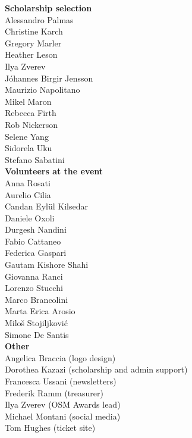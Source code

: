 \begin{multicols}{2}
\begin{small}
    \vspace{\volunteerSpace}
    \textbf{Scholarship selection}\\
    Alessandro Palmas\\
    Christine Karch\\
    Gregory Marler\\
    Heather Leson\\
    Ilya Zverev\\
    Jóhannes Birgir Jensson\\
    Maurizio Napolitano\\
    Mikel Maron\\
    Rebecca Firth\\
    Rob Nickerson\\
    Selene Yang\\
    Sidorela Uku\\
    Stefano Sabatini\\

    \vspace{\volunteerSpace}
    \textbf{Volunteers at the event}\\
    Anna Rosati\\
    Aurelio Cilia\\
    Candan Eylül Kilsedar\\
    Daniele Oxoli\\
    Durgesh Nandini\\
    Fabio Cattaneo\\
    Federica Gaspari\\
    Gautam Kishore Shahi\\
    Giovanna Ranci\\
    Lorenzo Stucchi\\
    Marco Brancolini\\
    Marta Erica Arosio\\
    Miloš Stojiljković\\
    Simone De Santis\\

    \vspace{\volunteerSpace}
    \textbf{Other}\\
    Angelica Braccia (logo design)\\
    Dorothea Kazazi (scholarship and admin support)\\
    Francesca Ussani (newsletters)\\
    Frederik Ramm (treasurer)\\
    Ilya Zverev (OSM Awards lead)\\
    Michael Montani (social media)\\
    Tom Hughes (ticket site)\\
  \end{small}
\end{multicols}
\justifying

\newpage
\pagestyle{sponsor-microsoft}
\null
\newpage
\pagestyle{sponsor-facebook}
\null
\newpage
\pagestyle{sponsor-mapbox}
\null
\newpage
